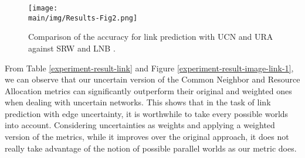 \documentclass[\main/thesis.tex]{subfiles}
\begin{document}
\begin{figure*}
\centering
\texttt{[image: \\main/img/Results-Fig2.png]}
\caption{Comparison of the accuracy for link prediction with UCN and URA against SRW \cite{liu2010link} and LNB \cite{liu2011link}.}
\label{experiment-result-image-link-2}
\end{figure*}




From Table \ref{experiment-result-link} and Figure \ref{experiment-result-image-link-1}, we can observe that our uncertain version of the Common Neighbor and Resource Allocation metrics can significantly outperform their original and weighted ones when dealing with uncertain networks. This shows that in the task of link prediction with edge uncertainty, it is worthwhile to take every possible worlds into account. Considering uncertainties as weights and applying a weighted version of the metrics, while it improves over the original approach, it does not really take advantage of the notion of possible parallel worlds as our metric does.
\end{document}
